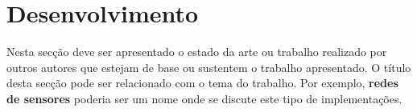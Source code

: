 \documentclass[journal, twoside, a4paper]{IEEEtran_LEEC_v1}
\begin{document}
%



\section{Desenvolvimento}
Nesta secção deve ser apresentado o estado da arte ou trabalho realizado por outros autores que estejam de base ou sustentem o trabalho apresentado. O título desta secção pode ser relacionado com o tema do trabalho. Por exemplo, \textbf{redes de sensores} poderia ser um nome onde se discute este tipo de implementações.
\end{document}
